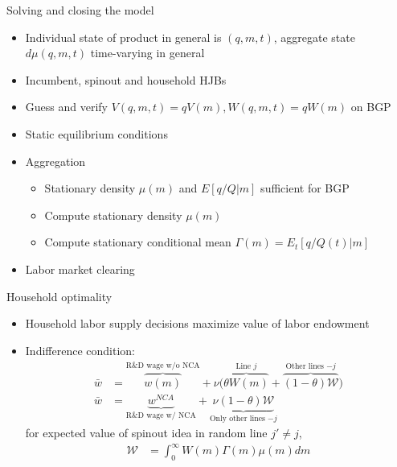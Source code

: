 \documentclass[english,usenames,dvipsnames]{beamer}
\begin{document}
\begin{frame}{Solving and closing the model}\label{closing_the_model}
\small
\begin{itemize}
\item Individual state of product in general is $(q,m,t)$, aggregate state $d\mu(q,m,t)$ time-varying in general 
\item Incumbent, spinout and household HJBs \hyperlink{HJB_incumbent}{} \hyperlink{HJB_spinout}{} \hyperlink{HJB_household}{}
\item Guess and verify $V(q,m,t) = qV(m), W(q,m,t) = qW(m)$ on BGP \hyperlink{scaling_of_value_functions}{}
\item Static equilibrium conditions \hyperlink{static_eq_conditions}{}
\item Aggregation 
\begin{itemize}
\item Stationary density $\mu(m)$ and $E[q/Q|m]$ sufficient for BGP \hyperlink{aggregate_distribution_and_bgp}{}
\item Compute stationary density $\mu(m)$  \hyperlink{aggregation}{}
\item Compute stationary conditional mean $\Gamma(m) = E_t[q/Q(t)|m]$ \hyperlink{aggregation}{}
\end{itemize}
\item Labor market clearing
\end{itemize}
\end{frame}

\begin{frame}{Household optimality}
\begin{itemize}
\item Household labor supply decisions maximize value of labor endowment
\item Indifference condition:
\begin{align*}
\bar{w} &= \overbrace{w(m)}^{\textrm{R\&D wage w/o NCA}} + \nu \Big(\overbrace{\theta W(m)}^{\textrm{Line $j$}} + \overbrace{(1-\theta) \mathcal{W}}^{\textrm{Other lines $-j$}} \Big) \\
\bar{w} &= \underbrace{w^{NCA}}_{\textrm{R\&D wage w/ NCA}} + \underbrace{\nu (1-\theta) \mathcal{W}}_{\textrm{Only other lines $-j$}}
\end{align*}
for expected value of spinout idea in random line $j' \ne j$,
\begin{align*}
\mathcal{W} &= \int_0^{\infty} W(m) \Gamma(m) \mu(m) dm
\end{align*}
\end{itemize}
\end{frame}
\end{document}
